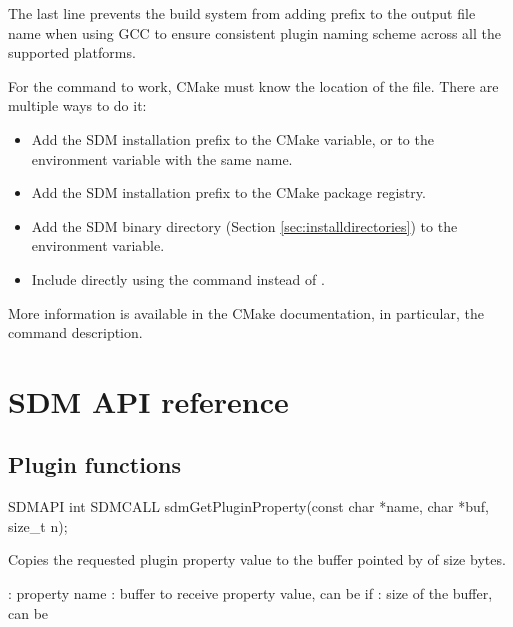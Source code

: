 \documentclass[a4paper,12pt,twoside,extrafontsizes]{memoir}
\begin{document}
The last line prevents the build system from adding  prefix to the output file name when using GCC to ensure consistent plugin naming scheme across all the supported platforms.

For the  command to work, CMake must know the location of the  file. There are multiple ways to do it:

\begin{itemize}
	\item Add the SDM installation prefix to the  CMake variable, or to the environment variable with the same name.
	\item Add the SDM installation prefix to the CMake package registry.
	\item Add the SDM binary directory (Section \ref{sec:installdirectories}) to the  environment variable.
	\item Include  directly using the  command instead of .
\end{itemize}

More information is available in the CMake documentation, in particular, the  command description.

\chapter{SDM API reference}
\label{ch:sdmapireference}

\section{Plugin functions}



\begin{cfuncprototype}
SDMAPI int SDMCALL sdmGetPluginProperty(const char *name, char *buf, size_t n);
\end{cfuncprototype}

\begin{funcdescr}
	Copies the requested plugin property value to the buffer pointed by  of size  bytes.
\end{funcdescr}

\begin{funcparams}
	: property name
	: buffer to receive property value, can be  if 
	: size of the buffer, can be 
\end{funcparams}
\end{document}
